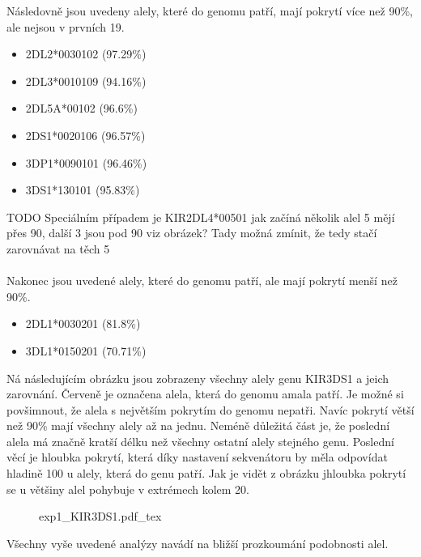 \documentclass[czech,DP]{thesiskiv}
\numberwithin{equation}{section}
\begin{document}
\noindent
Následovně jsou uvedeny alely, které do genomu patří, mají pokrytí více než 90\%, ale nejsou v prvních 19.
\begin{multicols}{2}
\begin{itemize}
	\itemsep0em
	\item 2DL2*0030102 (97.29\%)
	\item 2DL3*0010109 (94.16\%)
	\item 2DL5A*00102 (96.6\%)
	\item 2DS1*0020106 (96.57\%)
	\item 3DP1*0090101 (96.46\%)
	\item 3DS1*130101 (95.83\%)
\end{itemize}
\end{multicols}



TODO Speciálním případem je KIR2DL4*00501 jak začíná několik alel 5 mějí přes 90, další 3 jsou pod 90 viz obrázek? Tady možná zmínit, že tedy stačí zarovnávat na těch 5
\\
\\
\noindent
Nakonec jsou uvedené alely, které do genomu patří, ale mají pokrytí menší než 90\%.

\begin{multicols}{2}
\begin{itemize}
	\itemsep0em
	\item 2DL1*0030201 (81.8\%)
	\item 3DL1*0150201 (70.71\%)
\end{itemize}
\end{multicols}

\noindent
Ná následujícím obrázku jsou zobrazeny všechny alely genu KIR3DS1 a jeich zarovnání. Červeně je označena alela, která do genomu amala patří. Je možné si povšimnout, že alela s největším pokrytím do genomu nepatři. Navíc pokrytí větší než 90\% mají všechny alely až na jednu. Neméně důležitá část je, že poslední alela má značně kratší délku než všechny ostatní alely stejného genu. Poslední věcí je hloubka pokrytí, která díky nastavení sekvenátoru by měla odpovídat hladině 100 u alely, která do genu patří. Jak je vidět z obrázku jhloubka pokrytí se u většiny alel pohybuje v extrémech kolem 20. 

\begin{figure}[H]
    \centering
    \def\svgwidth{\columnwidth}
    {exp1_KIR3DS1.pdf_tex} 
\end{figure}



\noindent
Všechny vyše uvedené analýzy navádí na bližší prozkoumání podobnosti alel. 
\end{document}
